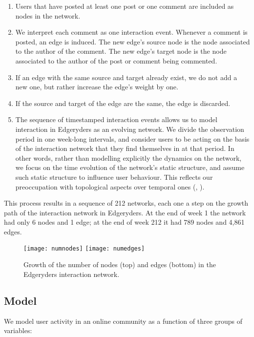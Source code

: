 \begin{enumerate}
\item Users that have posted at least one post or one comment are included as nodes in the network.
\item We interpret each comment as one interaction event. Whenever a comment is posted, an edge is induced. The new edge's source node is the node associated to the author of the comment. The new edge's target node is the node associated to the author of the post or comment being commented. 
\item If an edge with the same source and target already exist, we do not add a new one, but rather increase the edge's weight by one.
\item If the source and target of the edge are the same, the edge is discarded.  
\item The sequence of timestamped interaction events allows us to model interaction in Edgeryders as an evolving network. We divide the observation period in one week-long intervals, and consider users to be acting on the basis of the interaction network that they find themselves in at that period. In other words, rather than modelling explicitly the dynamics on the network, we focus on the time evolution of the network's static structure, and assume such static structure to influence user behaviour. This reflects our preoccupation with topological aspects over temporal ones (\cite{holme2012temporal}, \cite{rosvall2010mapping}). \end{enumerate}

This process results in a sequence of 212 networks, each one a step on the growth path of the interaction network in Edgeryders. At the end of week 1 the network had only 6 nodes and 1 edge; at the end of week 212 it had 789 nodes and 4,861 edges.

\begin{figure}
	\texttt{[image: numnodes]}
	\texttt{[image: numedges]}
	\caption{Growth of the number of nodes (top) and edges (bottom) in the Edgeryders interaction network.}
\label{fig:growthNodesEdges}
\end{figure}

\subsection{Model}

We model user activity in an online community as a function of three groups of variables:

